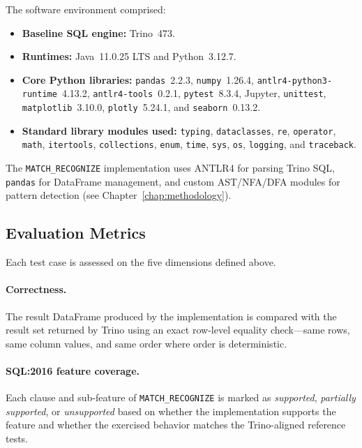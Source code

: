 The software environment comprised:
\begin{itemize}
  \item \textbf{Baseline SQL engine:} Trino~473.
  \item \textbf{Runtimes:} Java~11.0.25 LTS and Python~3.12.7.
  \item \textbf{Core Python libraries:} \texttt{pandas}~2.2.3,
    \texttt{numpy}~1.26.4,
    \texttt{antlr4-python3-runtime}~4.13.2,
    \texttt{antlr4-tools}~0.2.1,
    \texttt{pytest}~8.3.4,
    Jupyter,
    \texttt{unittest},
    \texttt{matplotlib}~3.10.0,
    \texttt{plotly}~5.24.1, and
    \texttt{seaborn}~0.13.2.
  \item \textbf{Standard library modules used:}
    \texttt{typing}, \texttt{dataclasses}, \texttt{re},
    \texttt{operator}, \texttt{math}, \texttt{itertools},
    \texttt{collections}, \texttt{enum}, \texttt{time},
    \texttt{sys}, \texttt{os}, \texttt{logging}, and
    \texttt{traceback}.
\end{itemize}

The \texttt{MATCH\_RECOGNIZE} implementation uses ANTLR4 for
parsing Trino SQL, \texttt{pandas} for DataFrame management, and
custom AST/NFA/DFA modules for pattern detection (see
Chapter~\ref{chap:methodology}).

\subsection{Evaluation Metrics}
\label{subsec:eval-metrics}

Each test case is assessed on the five dimensions defined above.

\paragraph{Correctness.}
The result DataFrame produced by the implementation is compared
with the result set returned by Trino using an exact row-level
equality check---same rows, same column values, and same order
where order is deterministic.

\paragraph{SQL:2016 feature coverage.}
Each clause and sub-feature of \texttt{MATCH\_RECOGNIZE} is marked
as \emph{supported}, \emph{partially supported}, or
\emph{unsupported} based on whether the implementation supports the
feature and whether the exercised behavior matches the Trino-aligned
reference tests.

